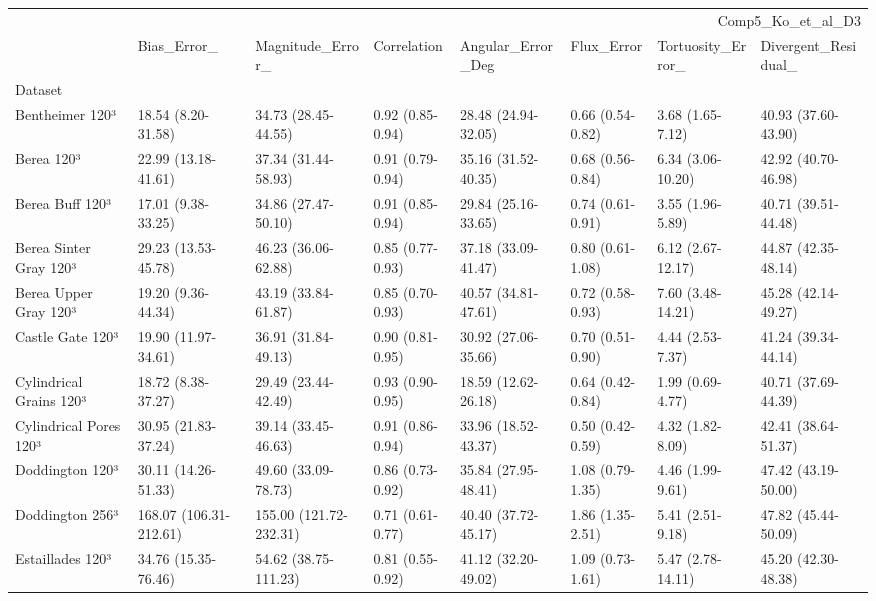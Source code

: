 \begin{tabular}{llllllll}
\toprule
 & \multicolumn{7}{r}{Comp5_Ko_et_al_D3} \\
 & Bias_Error_ & Magnitude_Error_ & Correlation & Angular_Error_Deg & Flux_Error & Tortuosity_Error_ & Divergent_Residual_ \\
Dataset &  &  &  &  &  &  &  \\
\midrule
Bentheimer 120³ & 18.54 (8.20-31.58) & 34.73 (28.45-44.55) & 0.92 (0.85-0.94) & 28.48 (24.94-32.05) & 0.66 (0.54-0.82) & 3.68 (1.65-7.12) & 40.93 (37.60-43.90) \\
Berea 120³ & 22.99 (13.18-41.61) & 37.34 (31.44-58.93) & 0.91 (0.79-0.94) & 35.16 (31.52-40.35) & 0.68 (0.56-0.84) & 6.34 (3.06-10.20) & 42.92 (40.70-46.98) \\
Berea Buff 120³ & 17.01 (9.38-33.25) & 34.86 (27.47-50.10) & 0.91 (0.85-0.94) & 29.84 (25.16-33.65) & 0.74 (0.61-0.91) & 3.55 (1.96-5.89) & 40.71 (39.51-44.48) \\
Berea Sinter Gray 120³ & 29.23 (13.53-45.78) & 46.23 (36.06-62.88) & 0.85 (0.77-0.93) & 37.18 (33.09-41.47) & 0.80 (0.61-1.08) & 6.12 (2.67-12.17) & 44.87 (42.35-48.14) \\
Berea Upper Gray 120³ & 19.20 (9.36-44.34) & 43.19 (33.84-61.87) & 0.85 (0.70-0.93) & 40.57 (34.81-47.61) & 0.72 (0.58-0.93) & 7.60 (3.48-14.21) & 45.28 (42.14-49.27) \\
Castle Gate 120³ & 19.90 (11.97-34.61) & 36.91 (31.84-49.13) & 0.90 (0.81-0.95) & 30.92 (27.06-35.66) & 0.70 (0.51-0.90) & 4.44 (2.53-7.37) & 41.24 (39.34-44.14) \\
Cylindrical Grains 120³ & 18.72 (8.38-37.27) & 29.49 (23.44-42.49) & 0.93 (0.90-0.95) & 18.59 (12.62-26.18) & 0.64 (0.42-0.84) & 1.99 (0.69-4.77) & 40.71 (37.69-44.39) \\
Cylindrical Pores 120³ & 30.95 (21.83-37.24) & 39.14 (33.45-46.63) & 0.91 (0.86-0.94) & 33.96 (18.52-43.37) & 0.50 (0.42-0.59) & 4.32 (1.82-8.09) & 42.41 (38.64-51.37) \\
Doddington 120³ & 30.11 (14.26-51.33) & 49.60 (33.09-78.73) & 0.86 (0.73-0.92) & 35.84 (27.95-48.41) & 1.08 (0.79-1.35) & 4.46 (1.99-9.61) & 47.42 (43.19-50.00) \\
Doddington 256³ & 168.07 (106.31-212.61) & 155.00 (121.72-232.31) & 0.71 (0.61-0.77) & 40.40 (37.72-45.17) & 1.86 (1.35-2.51) & 5.41 (2.51-9.18) & 47.82 (45.44-50.09) \\
Estaillades 120³ & 34.76 (15.35-76.46) & 54.62 (38.75-111.23) & 0.81 (0.55-0.92) & 41.12 (32.20-49.02) & 1.09 (0.73-1.61) & 5.47 (2.78-14.11) & 45.20 (42.30-48.38) \\

\end{tabular}
